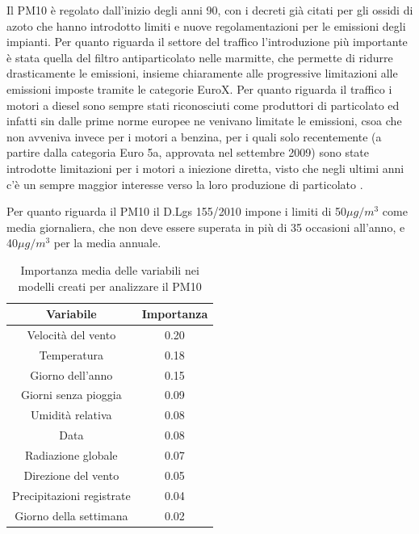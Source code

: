 \documentclass[a4paper]{report}
\begin{document}
Il PM10 è regolato dall'inizio degli anni 90, con i decreti già citati per gli ossidi di azoto che hanno introdotto limiti e nuove regolamentazioni per le emissioni degli impianti. Per quanto riguarda il settore del traffico l'introduzione più importante è stata quella del filtro antiparticolato nelle marmitte, che permette di ridurre drasticamente le emissioni, insieme chiaramente alle progressive limitazioni alle emissioni imposte tramite le categorie EuroX. 
Per quanto riguarda il traffico i motori a diesel sono sempre stati riconosciuti come produttori di particolato ed infatti sin dalle prime norme europee ne venivano limitate le emissioni, csoa che non avveniva invece per i motori a benzina, per i quali solo recentemente (a partire dalla categoria Euro 5a, approvata nel settembre 2009) sono state introdotte limitazioni per i motori a iniezione diretta, visto che negli ultimi anni c'è un sempre maggior interesse verso la loro produzione di particolato  \cite{Raza_2018}. 

Per quanto riguarda il PM10 il D.Lgs 155/2010 impone i limiti di 50$\mu g/m^3$ come media giornaliera, che non deve essere superata in più di 35 occasioni all'anno, e 40$\mu g/m^3$ per la media annuale.

\begin{table}[h!]
\centering
\begin{tabular}{ |c c| }
	\hline
	Variabile & Importanza \\
	\hline
	Velocità del vento & 0.20 \\
	Temperatura & 0.18 \\
	Giorno dell'anno & 0.15 \\
	Giorni senza pioggia & 0.09 \\
	Umidità relativa & 0.08 \\
	Data & 0.08 \\
	Radiazione globale & 0.07 \\
	Direzione del vento & 0.05 \\
	Precipitazioni registrate & 0.04 \\
	Giorno della settimana & 0.02 \\
	\hline
\end{tabular}
\caption{Importanza media delle variabili nei modelli creati per analizzare il PM10}
\label{table:importanza_pm10}
\end{table}
\end{document}
